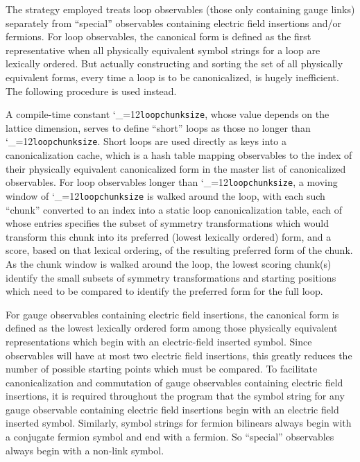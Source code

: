 \documentclass [12pt]{article}
\makeatletter
\renewcommand{\tt}{\begingroup\catcode`_=12\def\_{\string_}\tt@}
\newcommand{\tt@}[1]{\texttt{#1}\endgroup}
\makeatother
\begin{document}
The strategy employed treats loop observables
(those only containing gauge links)
separately from ``special'' observables containing
electric field insertions and/or fermions.
For loop observables,
the canonical form is defined as the first
representative when all physically equivalent
symbol strings for a loop are lexically ordered.
But actually constructing and sorting the set of 
all physically equivalent forms, every time a
loop is to be canonicalized, is hugely inefficient.
The following procedure is used instead.

A compile-time constant \tt{loopchunksize},
whose value depends on the lattice dimension,
serves to define ``short'' loops as those no longer
than \tt{loopchunksize}.
Short loops are used directly as keys into
a canonicalization cache, which is a hash
table mapping observables to the index
of their physically equivalent canonicalized
form in the master list of canonicalized observables.
For loop observables longer than \tt{loopchunksize},
a moving window of \tt{loopchunksize} is walked around
the loop, with each such ``chunk'' converted to an
index into a static loop canonicalization table,
each of whose entries specifies the subset of
symmetry transformations which would transform
this chunk into its preferred (lowest lexically ordered)
form, and a score, based on that lexical ordering, of
the resulting preferred form of the chunk.
As the chunk window is walked around the loop,
the lowest scoring chunk(s) identify the 
small subsets of symmetry transformations
and starting positions which
need to be compared to identify the preferred
form for the full loop.

For gauge observables containing electric field insertions,
the canonical form is defined as the lowest
lexically ordered form among those physically equivalent
representations which begin with an electric-field
inserted symbol.
Since observables will have at most two electric field insertions,
this greatly reduces the number of possible starting points
which must be compared.
To facilitate canonicalization and commutation of
gauge observables containing electric field insertions,
it is required throughout the program that the
symbol string for any gauge observable containing electric
field insertions begin with an electric field inserted symbol.
Similarly, symbol strings for fermion bilinears always
begin with a conjugate fermion symbol and end with a fermion.
So ``special'' observables always begin with a non-link symbol.
\end{document}
